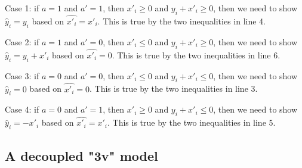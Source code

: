 Case 1: if $a = 1$ and $a' = 1$, then $x'_i \geq 0 $ and $y_i+x'_i\geq 0$, then we need to show $\hat{y}_i = y_i$ based on  $\hat{x'_i} = x'_i$. This is true by the two inequalities in line 4.

Case 2: if $a = 1$ and $a' = 0$, then $x'_i \leq 0 $ and $y_i+x'_i\geq 0$, then we need to show $\hat{y}_i = y_i+x'_i$ based on  $\hat{x'_i} = 0$. This is true by the two inequalities in line 6.

Case 3: if $a = 0$ and $a' = 0$, then $x'_i \leq 0 $ and $y_i+x'_i\leq 0$, then we need to show $\hat{y}_i = 0$ based on  $\hat{x'_i} = 0$. This is true by the two inequalities in line 3.


Case 4: if $a = 0$ and $a' = 1$, then $x'_i \geq 0 $ and $y_i+x'_i\leq 0$, then we need to show $\hat{y}_i = -x'_i$ based on  $\hat{x'_i} = x'_i$. This is true by the two inequalities in line 5.

\fi


	
	
	

	
    
    
    


    \subsection{A decoupled "3v" model}

